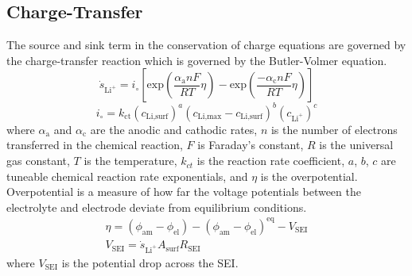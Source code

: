 \documentclass[12pt]{article}
\begin{document}
	\subsection{Charge-Transfer} \label{sec:Charge-Transfer}
	The source and sink term in the conservation of charge equations are governed by the charge-transfer reaction which is governed by the Butler-Volmer equation.
	\begin{equation}
		\dot{s}_{\textrm{Li}^+} = i_\circ \left[\textrm{exp}\left(\frac{\alpha_\textrm{a}nF}{RT}\eta\right)
		-\textrm{exp}\left(\frac{-\alpha_\textrm{c}nF}{RT}\eta \right)\right]
	\end{equation}
	\begin{equation}
		i_\circ = k_{\text{ct}} (c_{\text{Li,surf}})^{a}( c_{\text{Li,max}} - c_{\text{Li,surf}})^{b} (c_{\text{Li}^+})^{c}
	\end{equation}
	where $\alpha_\textrm{a}$ and $\alpha_\textrm{c}$ are the anodic and cathodic rates, $n$ is the number of electrons transferred in the chemical reaction, $F$ is Faraday's constant, $R$ is the universal gas constant, $T$ is the temperature, $k_{ct}$ is the reaction rate coefficient, $a$, $b$, $c$ are tuneable chemical reaction rate exponentials, and $\eta$ is the overpotential. Overpotential is a measure of how far the voltage potentials between the electrolyte and electrode deviate from equilibrium conditions.
	\begin{gather}
		\eta = (\phi_\textrm{am}-\phi_\textrm{el}) - (\phi_\textrm{am}-\phi_\textrm{el})^\textrm{eq} - V_\textrm{SEI}\\
		V_\textrm{SEI} = \dot{s}_{\textrm{Li}^+} A_\text{surf}R_\textrm{SEI}
	\end{gather}
	where $V_\textrm{SEI}$ is the potential drop across the SEI. 

	
\end{document}
